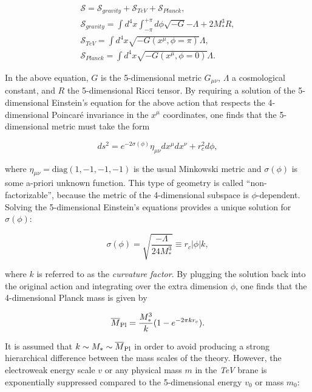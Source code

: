 \begin{equation}\label{eqn:WED_2}
\begin{gathered}
\mathcal{S} = \mathcal{S}_{gravity} + \mathcal{S}_{TeV} + \mathcal{S}_{Planck}, \\
\mathcal{S}_{gravity} = \int d^4x \int_{-\pi}^{+\pi} d\phi\sqrt{-G}{-\Lambda+2M^3_*R}, \\
\mathcal{S}_{TeV} = \int d^4x\sqrt{-G(x^\mu,\phi=\pi)}\Lambda, \\
\mathcal{S}_{Planck} = \int d^4x\sqrt{-G(x^\mu,\phi=0)}\Lambda.
\end{gathered}
\end{equation}

In the above equation, $G$ is the 5-dimensional metric $G_{\mu\nu}$, $\Lambda$ a cosmological constant, and $R$ the 5-dimensional Ricci tensor.
By requiring a solution of the 5-dimensional Einstein's equation for the above action that respects the 4-dimensional Poincar\'{e} invariance in the $x^\mu$ coordinates,
one finds that the 5-dimensional metric must take the form 

\begin{equation}\label{eqn:WED_3}
ds^2 = e^{-2\sigma(\phi)} \eta_{\mu\nu}dx^\mu dx^\nu + r^2_cd\phi,
\end{equation}

\noindent where $\eta_{\mu\nu} = \mathrm{diag}(1,-1,-1,-1)$ is the usual Minkowski metric and $\sigma(\phi)$ is some a-priori unknown function.
This type of geometry is called ``non-factorizable'', because the metric of the 4-dimensional subspace is $\phi$-dependent.
Solving the 5-dimensional Einstein's equations provides a unique solution for $\sigma(\phi)$:

\begin{equation}\label{eqn:WED_4}
\sigma(\phi) = \sqrt{\frac{-\Lambda}{24M^3_*}} \equiv r_c|\phi|k,
\end{equation}

\noindent where $k$ is referred to as the \textit{curvature factor}.
By plugging the solution back into the original action and integrating over the extra dimension $\phi$, one finds that the 4-dimensional Planck mass is given by

\begin{equation}\label{eqn:WED_5}
\overline{M}_\mathrm{Pl} = \frac{M^3_*}{k}(1 - e^{-2\pi kr_c}).
\end{equation}

It is assumed that $k \sim M_* \sim \overline{M}_\mathrm{Pl}$ in order to avoid producing a strong hierarchical difference between the mass scales of the theory.
However, the electroweak energy scale $v$ or any physical mass $m$ in the \textit{TeV} brane is exponentially suppressed compared to the 5-dimensional energy $v_0$ or mass $m_0$:

